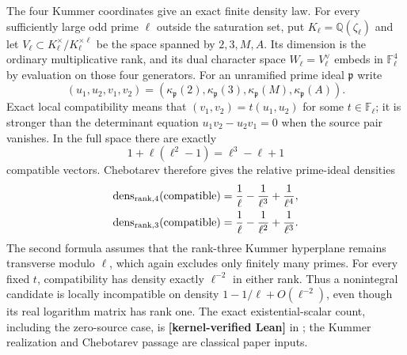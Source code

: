 \documentclass[11pt,oneside]{article}
\theoremstyle{definition}
\theoremstyle{remark}
\newcommand{\Q}{\mathbb Q}
\newcommand{\lean}[1]{\texttt{\detokenize{#1}}}
\newcommand{\statuslean}{\textcolor{leanblue}{\textbf{[kernel-verified Lean]}}}
\begin{document}
The four Kummer coordinates give an exact finite density law.  For every sufficiently large
odd prime $\ell$ outside the saturation set, put $K_\ell=\Q(\zeta_\ell)$ and let
$V_\ell\subset K_\ell^\times/K_\ell^{\times\ell}$ be the space spanned by $2,3,M,A$.
Its dimension is the ordinary multiplicative rank, and its dual character space
$W_\ell=V_\ell^\vee$ embeds in $\mathbb F_\ell^4$ by evaluation on those four generators.
For an unramified prime ideal $\mathfrak p$ write
\begin{equation}
 (u_1,u_2,v_1,v_2)=
 (\kappa_{\mathfrak p}(2),\kappa_{\mathfrak p}(3),
  \kappa_{\mathfrak p}(M),\kappa_{\mathfrak p}(A)).
 \label{crit:eq-kummer-coordinate-vector}
\end{equation}
Exact local compatibility means that $(v_1,v_2)=t(u_1,u_2)$ for some
$t\in\mathbb F_\ell$; it is stronger than the determinant equation
$u_1v_2-u_2v_1=0$ when the source pair vanishes.  In the full space there are exactly
\begin{equation}
 1+\ell(\ell^2-1)=\ell^3-\ell+1
 \label{crit:eq-compatible-vector-count}
\end{equation}
compatible vectors.  Chebotarev therefore gives the relative prime-ideal densities
\begin{align}
 \operatorname{dens}_{\mathrm{rank},4}(\mathrm{compatible})
 &=\frac1\ell-\frac1{\ell^3}+\frac1{\ell^4},\notag\\
 \operatorname{dens}_{\mathrm{rank},3}(\mathrm{compatible})
 &=\frac1\ell-\frac1{\ell^2}+\frac1{\ell^3}.
 \label{crit:eq-exact-kummer-densities}
\end{align}
The second formula assumes that the rank-three Kummer hyperplane remains transverse modulo
$\ell$, which again excludes only finitely many primes.  For every fixed $t$,
compatibility has density exactly $\ell^{-2}$ in either rank.  Thus a nonintegral candidate
is locally incompatible on density $1-1/\ell+O(\ell^{-2})$, even though its real logarithm
matrix has rank one.  The exact existential-scalar count, including the zero-source case, is
\statuslean{} in \lean{KummerCompatibilityFinite}; the Kummer realization and Chebotarev
passage are classical paper inputs.
\end{document}
